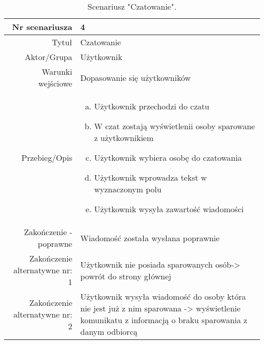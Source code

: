 \documentclass[12pt,a4paper]{article}
\begin{document}
\begin{table} [H]
\centering
\begin{tabular}{|r|p{9cm}|} \hline
Nr scenariusza & 4 \\
\hline
Tytuł & Czatowanie \\
\hline
Aktor/Grupa & Użytkownik \\
\hline
Warunki wejściowe & Dopasowanie się użytkowników \\
\hline
Przebieg/Opis & 
\begin{enumerate}[a)]
\item Użytkownik przechodzi do czatu
\item W czat zostają wyświetlenii osoby sparowane z użytkownikiem
\item Użytkownik wybiera  osobę do czatowania
\item Użytkownik wprowadza tekst w wyznaczonym polu
\item Użytkownik wysyła zawartość wiadomości
\end{enumerate}
\\
\hline
Zakończenie - poprawne & Wiadomość została wysłana poprawnie
\\ 
\hline
Zakończenie alternatywne nr: 1 & Użytkownik nie posiada sparowanych osób-> powrót do strony głównej
\\
\hline
Zakończenie alternatywne nr: 2 & Użytkownik wysyła wiadomość do osoby która nie jest już z nim sparowana -> wyświetlenie komunikatu z informacją o braku sparowania z danym odbiorcą
\\
\hline
\end{tabular}
\caption{Scenariusz "Czatowanie".}
\label{table:4}
\end{table}
\end{document}
